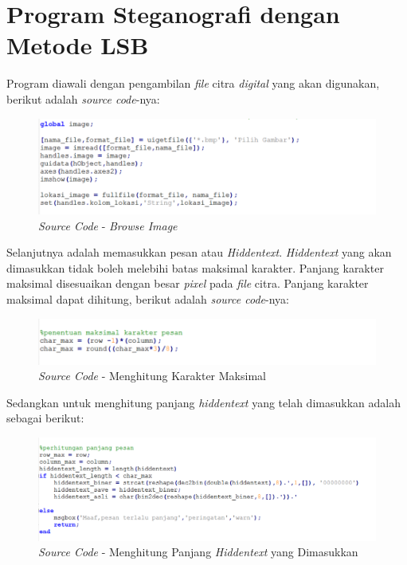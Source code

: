 \section{Program Steganografi dengan Metode LSB}
Program diawali dengan pengambilan \emph{file} citra \emph{digital} yang akan digunakan, berikut adalah \emph{source code}-nya:
	\begin{figure}[H]
		\centering
		\includegraphics[width=1\textwidth]{gambar/sourcecode/browse_image}
		\caption{\emph{Source Code} - \emph{Browse Image}}
		\label{browse_image}
	\end{figure}

Selanjutnya adalah memasukkan pesan atau \emph{Hiddentext}. \emph{Hiddentext} yang akan dimasukkan tidak boleh melebihi batas maksimal karakter. Panjang karakter maksimal disesuaikan dengan besar \emph{pixel} pada \emph{file} citra. Panjang karakter maksimal dapat dihitung, berikut adalah \emph{source code}-nya:
	\begin{figure}[H]
		\centering
		\includegraphics[width=1\textwidth]{gambar/sourcecode/karakter_maksimal}
		\caption{\emph{Source Code} - Menghitung Karakter Maksimal}
		\label{karakter_max}
	\end{figure}

Sedangkan untuk menghitung panjang \emph{hiddentext} yang telah dimasukkan adalah sebagai berikut:
	\begin{figure}[H]
		\centering
		\includegraphics[width=1\textwidth]{gambar/sourcecode/panjang_pesan}
		\caption{\emph{Source Code} - Menghitung Panjang \emph{Hiddentext} yang Dimasukkan}
		\label{panjang_pesan}
	\end{figure}

